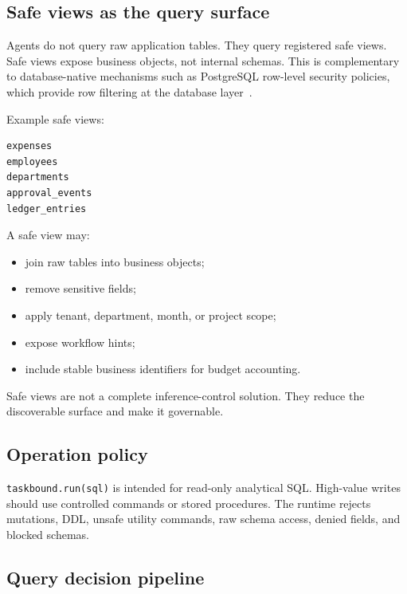 \documentclass[journal]{IEEEtran}
\providecommand{\tightlist}{%
  \setlength{\itemsep}{0pt}\setlength{\parskip}{0pt}}
\begin{document}
\hypertarget{safe-views-as-the-query-surface}{%
\subsection{Safe views as the query
surface}\label{safe-views-as-the-query-surface}}

Agents do not query raw application tables. They query registered safe
views. Safe views expose business objects, not internal schemas. This is
complementary to database-native mechanisms such as PostgreSQL
row-level security policies, which provide row filtering at the database
layer~\cite{postgresql2026rowsecurity}.

Example safe views:

\begin{verbatim}
expenses
employees
departments
approval_events
ledger_entries
\end{verbatim}

A safe view may:

\begin{itemize}
\tightlist
\item
  join raw tables into business objects;
\item
  remove sensitive fields;
\item
  apply tenant, department, month, or project scope;
\item
  expose workflow hints;
\item
  include stable business identifiers for budget accounting.
\end{itemize}

Safe views are not a complete inference-control solution. They reduce
the discoverable surface and make it governable.

\hypertarget{operation-policy}{%
\subsection{Operation policy}\label{operation-policy}}

\texttt{taskbound.run(sql)} is intended for read-only analytical SQL.
High-value writes should use controlled commands or stored procedures.
The runtime rejects mutations, DDL, unsafe utility commands, raw schema
access, denied fields, and blocked schemas.

\hypertarget{query-decision-pipeline}{%
\subsection{Query decision
pipeline}\label{query-decision-pipeline}}
\end{document}

